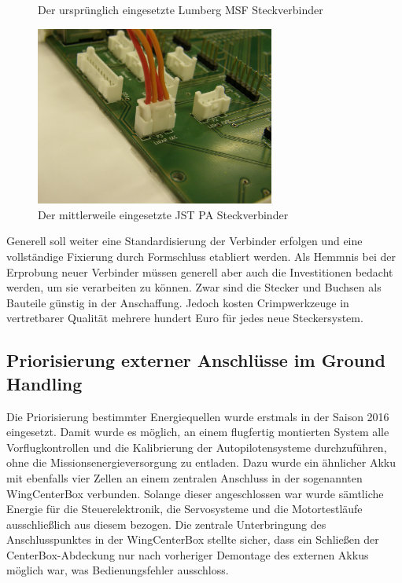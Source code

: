 \begin{figure}[H]
\centering
{}
\caption{Der ursprünglich eingesetzte Lumberg MSF Steckverbinder} 
\label{fig:Der ursprünglich eingesetzte Lumberg MSF Steckverbinder}
\end{figure}

\begin{figure}[H]
\centering
\includegraphics[width=0.7\textwidth]{bilder/Stecker/Stecker_JST_PA.jpg} 
\caption{Der mittlerweile eingesetzte JST PA Steckverbinder} 
\label{fig:Der mittlerweile eingesetzte JST PA Steckverbinder}
\end{figure}

Generell soll weiter eine Standardisierung der Verbinder erfolgen und eine vollständige Fixierung durch Formschluss etabliert werden.
Als Hemmnis bei der Erprobung neuer Verbinder müssen generell aber auch die Investitionen bedacht werden, um sie verarbeiten zu können. Zwar sind die Stecker und Buchsen als Bauteile günstig in der Anschaffung. Jedoch kosten Crimpwerkzeuge in vertretbarer Qualität  mehrere hundert Euro für jedes neue Steckersystem.





\subsection{Priorisierung externer Anschlüsse im Ground Handling}

Die Priorisierung bestimmter Energiequellen wurde erstmals in der Saison 2016 eingesetzt. Damit wurde es möglich, an einem flugfertig montierten System alle Vorflugkontrollen und die Kalibrierung der Autopilotensysteme durchzuführen, ohne die Missionsenergieversorgung zu entladen. Dazu wurde ein ähnlicher Akku mit ebenfalls vier Zellen an einem zentralen Anschluss in der sogenannten WingCenterBox verbunden. Solange dieser angeschlossen war wurde sämtliche Energie für die Steuerelektronik, die Servosysteme und die Motortestläufe ausschließlich aus diesem bezogen. Die zentrale Unterbringung des Anschlusspunktes in der WingCenterBox stellte sicher, dass ein Schließen der CenterBox-Abdeckung nur nach vorheriger Demontage des externen Akkus möglich war, was Bedienungsfehler ausschloss.

